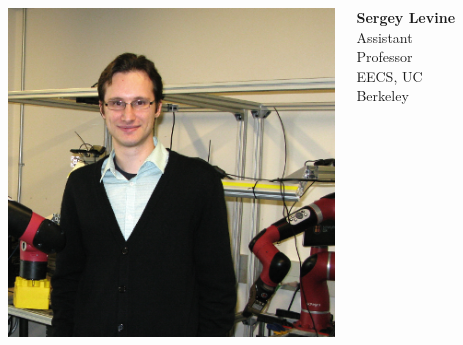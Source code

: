 \documentclass[compress]{beamer}
\begin{document}
\begin{frame}
\begin{columns}
\begin{column}{.3\textwidth}
            \includegraphics[width=\textwidth,height=.5\textheight]{auth3}
        \end{column}
        \begin{column}{.2\textwidth}
            \tiny
            \textbf{Sergey Levine} \\
            Assistant Professor \\
            EECS, UC Berkeley \\
        \end{column}
        \begin{column}{.3\textwidth}
        \end{column}
        \begin{column}{.2\textwidth}
        \end{column}
    \end{columns}

\end{frame}
\end{document}
